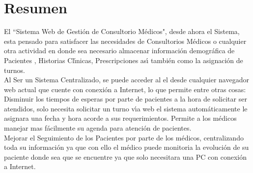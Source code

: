 \section{Resumen}

El ``Sistema Web de Gesti\'on de Consultorio M\'edicos", desde ahora el Sistema, esta pensado para satisfacer las necesidades de Consultorios M\'edicos o cualquier otra actividad en donde sea necesario almacenar informaci\'on demogr\'afica de Pacientes , Historias Cl\'{\i}nicas, Prescripciones as\'{\i} tambi\'en como la asignaci\'on de turnos.\\[0.1cm] 
Al Ser un Sistema Centralizado, se puede acceder al el desde cualquier navegador web actual que cuente con conexi\'on a Internet, lo que permite entre otras cosas:\\[0.1cm]

Disminuir los tiempos de esperas por parte de pacientes a la hora de solicitar ser atendidos, solo necesita solicitar un turno v\'{\i}a web el sistema autom\'aticamente le asignara una fecha y hora acorde a sus requerimientos. Permite a los m\'edicos manejar mas f\'acilmente su agenda para atenci\'on de pacientes.\\[0.1cm]

Mejorar el Seguimiento de los Pacientes por parte de los m\'edicos, centralizando toda su informaci\'on ya que con ello el m\'edico puede monitoria la evoluci\'on de su paciente donde sea que se encuentre ya que solo necesitara una PC con conexi\'on a Internet.\\[0.1cm]








